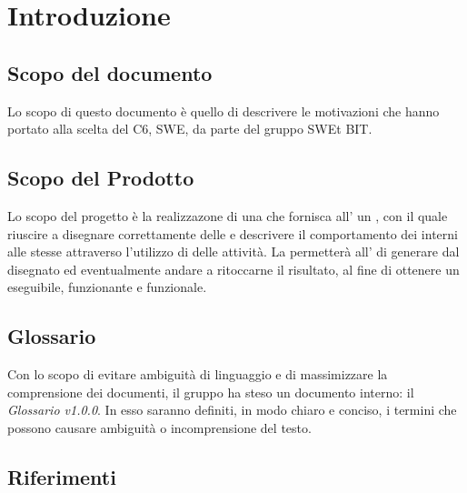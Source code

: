 \section{Introduzione}
  \subsection{Scopo del documento}
          Lo scopo di questo documento è quello di descrivere le motivazioni che hanno portato alla scelta del  C6, SWE, da parte del gruppo SWEt BIT.
  \subsection{Scopo del Prodotto}
          Lo scopo del progetto è la realizzazone di una  che fornisca all' un  , con il quale riuscire a disegnare correttamente  delle 
          e descrivere il comportamento dei  interni alle stesse attraverso l'utilizzo di  delle attività.
          La  permetterà all' di generare   dal  disegnato ed eventualmente andare a ritoccarne il risultato, al fine di ottenere un 
          eseguibile, funzionante e funzionale.
  \subsection{Glossario}
          Con lo scopo di evitare ambiguità di linguaggio e di massimizzare la comprensione dei documenti, il
          gruppo ha steso un documento interno: il \emph{Glossario v1.0.0}. In esso saranno definiti, in modo
          chiaro e conciso, i termini che possono causare ambiguità o incomprensione del testo.
  \subsection{Riferimenti}
